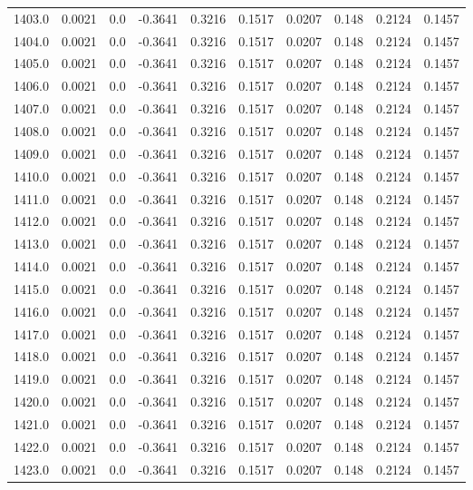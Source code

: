 \begin{longtable}{lrrrrrrrrr}
1403.0 & 0.0021 & 0.0 & -0.3641 & 0.3216 & 0.1517 & 0.0207 & 0.148 & 0.2124 & 0.1457 \\
1404.0 & 0.0021 & 0.0 & -0.3641 & 0.3216 & 0.1517 & 0.0207 & 0.148 & 0.2124 & 0.1457 \\
1405.0 & 0.0021 & 0.0 & -0.3641 & 0.3216 & 0.1517 & 0.0207 & 0.148 & 0.2124 & 0.1457 \\
1406.0 & 0.0021 & 0.0 & -0.3641 & 0.3216 & 0.1517 & 0.0207 & 0.148 & 0.2124 & 0.1457 \\
1407.0 & 0.0021 & 0.0 & -0.3641 & 0.3216 & 0.1517 & 0.0207 & 0.148 & 0.2124 & 0.1457 \\
1408.0 & 0.0021 & 0.0 & -0.3641 & 0.3216 & 0.1517 & 0.0207 & 0.148 & 0.2124 & 0.1457 \\
1409.0 & 0.0021 & 0.0 & -0.3641 & 0.3216 & 0.1517 & 0.0207 & 0.148 & 0.2124 & 0.1457 \\
1410.0 & 0.0021 & 0.0 & -0.3641 & 0.3216 & 0.1517 & 0.0207 & 0.148 & 0.2124 & 0.1457 \\
1411.0 & 0.0021 & 0.0 & -0.3641 & 0.3216 & 0.1517 & 0.0207 & 0.148 & 0.2124 & 0.1457 \\
1412.0 & 0.0021 & 0.0 & -0.3641 & 0.3216 & 0.1517 & 0.0207 & 0.148 & 0.2124 & 0.1457 \\
1413.0 & 0.0021 & 0.0 & -0.3641 & 0.3216 & 0.1517 & 0.0207 & 0.148 & 0.2124 & 0.1457 \\
1414.0 & 0.0021 & 0.0 & -0.3641 & 0.3216 & 0.1517 & 0.0207 & 0.148 & 0.2124 & 0.1457 \\
1415.0 & 0.0021 & 0.0 & -0.3641 & 0.3216 & 0.1517 & 0.0207 & 0.148 & 0.2124 & 0.1457 \\
1416.0 & 0.0021 & 0.0 & -0.3641 & 0.3216 & 0.1517 & 0.0207 & 0.148 & 0.2124 & 0.1457 \\
1417.0 & 0.0021 & 0.0 & -0.3641 & 0.3216 & 0.1517 & 0.0207 & 0.148 & 0.2124 & 0.1457 \\
1418.0 & 0.0021 & 0.0 & -0.3641 & 0.3216 & 0.1517 & 0.0207 & 0.148 & 0.2124 & 0.1457 \\
1419.0 & 0.0021 & 0.0 & -0.3641 & 0.3216 & 0.1517 & 0.0207 & 0.148 & 0.2124 & 0.1457 \\
1420.0 & 0.0021 & 0.0 & -0.3641 & 0.3216 & 0.1517 & 0.0207 & 0.148 & 0.2124 & 0.1457 \\
1421.0 & 0.0021 & 0.0 & -0.3641 & 0.3216 & 0.1517 & 0.0207 & 0.148 & 0.2124 & 0.1457 \\
1422.0 & 0.0021 & 0.0 & -0.3641 & 0.3216 & 0.1517 & 0.0207 & 0.148 & 0.2124 & 0.1457 \\
1423.0 & 0.0021 & 0.0 & -0.3641 & 0.3216 & 0.1517 & 0.0207 & 0.148 & 0.2124 & 0.1457 \\

\end{longtable}
